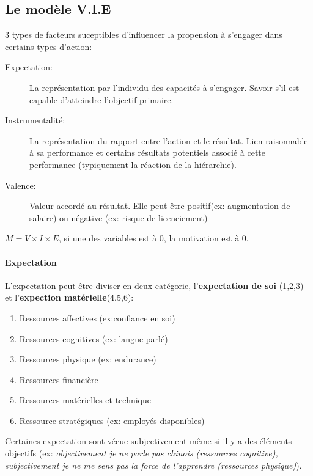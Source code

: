 \documentclass[11pt]{article} %
\begin{document}
	\subsection{Le modèle V.I.E}
		3 types de facteurs suceptibles d'influencer la propension à s'engager dans certains types d'action:
		\begin{description}
			\item[Expectation: ] La représentation par l'individu des capacités à s'engager. Savoir s'il est capable d'atteindre l'objectif primaire. 
			\item[Instrumentalité: ] La représentation du rapport entre l'action et le résultat. Lien raisonnable à sa performance et certains résultats potentiels associé à cette performance (typiquement la réaction de la hiérarchie).
			\item[Valence: ] Valeur accordé au résultat. Elle peut être positif(ex: augmentation de salaire) ou	négative (ex: risque de licenciement)
		\end{description}
		$M=V\times I \times E$, si une des variables est à 0, la motivation est à 0. 
		\paragraph{Expectation} L'expectation peut être diviser en deux catégorie, l'\textbf{expectation de soi}
		(1,2,3) et l'\textbf{expection matérielle}(4,5,6):
		\begin{multicols}{2}
			\begin{enumerate}
				\item Ressources affectives (ex:confiance en soi)
				\item Ressources cognitives (ex: langue parlé)
				\item Ressources physique (ex: endurance)
				\item Ressources financière
				\item Ressources matérielles et technique
				\item Ressource stratégiques (ex: employés disponibles)
			\end{enumerate}
		\end{multicols}

		Certaines expectation sont vécue subjectivement même si il y a des éléments objectifs (ex: \textit{objectivement je ne parle pas chinois (ressources cognitive), subjectivement je ne me sens pas la force de l'apprendre (ressources physique)}).
\end{document}
